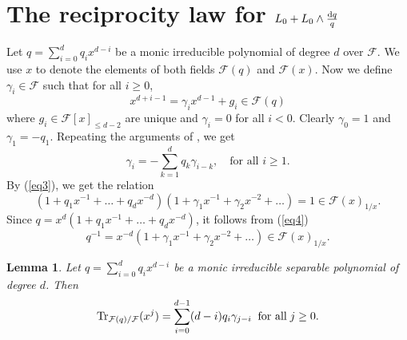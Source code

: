 \documentclass[times,10pt]{amsart}
\newcommand{\dd}{{\rm d}}
\newcommand{\F}{\ensuremath{\mathcal{F}}}
\newtheorem{lemma}[thm]{Lemma}%
\begin{document}
               

  \section{The reciprocity law for $L_0+ L_0\wedge \frac{\dd q}{q}$ }\label{5srl}  


  Let $q=\sum_{i=0}^{d}q_ix^{d-i}$ be a monic irreducible polynomial of degree $d$ over $\F$.    We use $x$ to denote the elements of both fields $\F(q)$ and $\F(x)$. Now we define  $\gamma_i\in \F$ such that  for all $i\geq 0$, $$ x^{d+i-1}= \gamma_ix^{d-1}+g_i\in \F(q)$$ where $  g_i\in \F[x]_{\leq d-2}$ are unique and  $\gamma_i=0$ for all $i<0$.  Clearly $ \gamma_0=1$ and $ \gamma_1= -q_1$.   Repeating the arguments of \cite[Section 4]{Laghribi-Maiti}, we get  \begin{equation}\label{eq3} \gamma_i=-\sum_{k=1}^{d} q_k \gamma_{i-k}, \quad \text{for all } i\geq 1.
  \end{equation}   By (\ref{eq3}), we get  the relation \begin{equation}\label{eq4}(1+ q_1x^{-1}+\ldots+ q_dx^{-d}) ( 1+ \gamma_1x^{-1}+ \gamma_2 x^{-2}+\ldots)=1\in \F(x)_{1/x}.   \end{equation} Since $q= x^d( 1+ q_1x^{-1}+\ldots+ q_d x^{-d})$, it follows from (\ref{eq4})    \begin{equation}\label{eq5}q^{-1}= x^{-d}( 1+ \gamma_1x^{-1}+\gamma_2x^{-2}+\ldots)\in \F(x)_{1/x}.
                           \end{equation} 

  \begin{lemma}\label{l81}
  Let $ q= \sum_{i=0}^{d} q_i x^{d-i}$ be a monic irreducible  separable polynomial of degree $d$.  Then $${\rm Tr}_{\F(q)/\F}( x^j)= \sum_{i=0}^{d-1} (d-i)q_i \gamma_{j-i}\;\;\text{for all}\; j\geq 0.$$
  \end{lemma}
\end{document}
